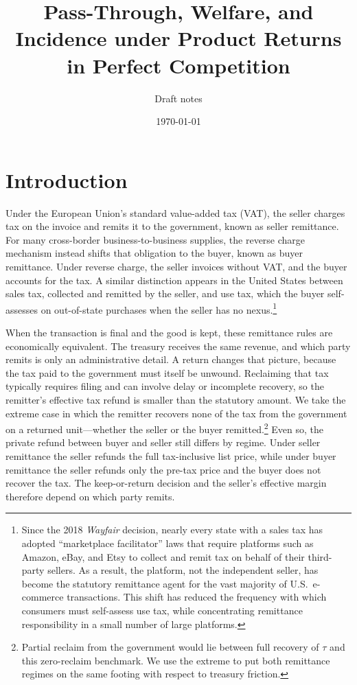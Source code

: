 \documentclass[11pt]{article}
\title{Pass-Through, Welfare, and Incidence under Product Returns\\
  in Perfect Competition}
\author{Draft notes}
\date{\today}
\begin{document}
\maketitle

\section{Introduction}

Under the European Union's standard value-added tax (VAT), the seller charges
tax on the invoice and remits it to the government, known as seller
remittance.  For many cross-border business-to-business supplies, the reverse
charge mechanism instead shifts that obligation to the buyer, known as buyer
remittance.  Under reverse charge, the seller invoices without VAT, and the
buyer accounts for the tax.  A similar distinction appears in the United States
between sales tax, collected and remitted by the seller, and use tax, which
the buyer self-assesses on out-of-state purchases when the seller has no
nexus.\footnote{Since the 2018 \emph{Wayfair} decision, nearly every state
  with a sales tax has adopted ``marketplace facilitator'' laws that require
  platforms such as Amazon, eBay, and Etsy to collect and remit tax on behalf
  of their third-party sellers.  As a result, the platform, not the
  independent seller, has become the statutory remittance agent for the vast
  majority of U.S.\ e-commerce transactions.  This shift has reduced the
  frequency with which consumers must self-assess use tax, while concentrating
  remittance responsibility in a small number of large platforms.}

When the transaction is final and the good is kept, these remittance rules
are economically equivalent.  The treasury receives the same revenue, and
which party remits is only an administrative detail.  A return changes that
picture, because the tax paid to the government must itself be unwound.
Reclaiming that tax typically requires filing and can involve delay or
incomplete recovery, so the remitter's effective tax refund is smaller than
the statutory amount.  We take the extreme case in which the remitter
recovers none of the tax from the government on a returned unit---whether
the seller or the buyer remitted.\footnote{Partial reclaim from the
  government would lie between full recovery of $\tau$ and this zero-reclaim
  benchmark.  We use the extreme to put both remittance regimes on the same
  footing with respect to treasury friction.}
Even so, the private refund between buyer and seller still differs by
regime.  Under seller remittance the seller refunds the full tax-inclusive
list price, while under buyer remittance the seller refunds only the
pre-tax price and the buyer does not recover the tax.  The keep-or-return
decision and the seller's effective margin therefore depend on which party
remits.
\end{document}
